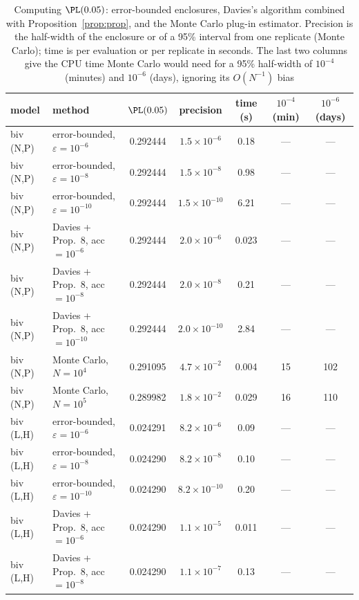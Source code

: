 \begin{table}[t]
\caption{Computing $\PL(0.05)$: error-bounded enclosures, Davies's algorithm combined with Proposition~\ref{prop:prop}, and the Monte Carlo plug-in estimator. Precision is the half-width of the enclosure or of a 95\% interval from one replicate (Monte Carlo); time is per evaluation or per replicate in seconds. The last two columns give the CPU time Monte Carlo would need for a 95\% half-width of $10^{-4}$ (minutes) and $10^{-6}$ (days), ignoring its $O(N^{-1})$ bias}\label{tab:benchpl}
\footnotesize\setlength{\tabcolsep}{2pt}
\begin{tabular*}{\textwidth}{@{\extracolsep\fill}llccccc@{}}
\toprule
model & method & $\PL(0.05)$ & precision & time (s) & $10^{-4}$ (min) & $10^{-6}$ (days)\\
\midrule
biv (N,P) & error-bounded, $\varepsilon=10^{-6}$ & 0.292444 & $1.5\times10^{-6}$ & 0.18 & --- & --- \\
biv (N,P) & error-bounded, $\varepsilon=10^{-8}$ & 0.292444 & $1.5\times10^{-8}$ & 0.98 & --- & --- \\
biv (N,P) & error-bounded, $\varepsilon=10^{-10}$ & 0.292444 & $1.5\times10^{-10}$ & 6.21 & --- & --- \\
biv (N,P) & Davies + Prop.~8, acc $=10^{-6}$ & 0.292444 & $2.0\times10^{-6}$ & 0.023 & --- & --- \\
biv (N,P) & Davies + Prop.~8, acc $=10^{-8}$ & 0.292444 & $2.0\times10^{-8}$ & 0.21 & --- & --- \\
biv (N,P) & Davies + Prop.~8, acc $=10^{-10}$ & 0.292444 & $2.0\times10^{-10}$ & 2.84 & --- & --- \\
biv (N,P) & Monte Carlo, $N=10^{4}$ & 0.291095 & $4.7\times10^{-2}$ & 0.004 & 15 & 102 \\
biv (N,P) & Monte Carlo, $N=10^{5}$ & 0.289982 & $1.8\times10^{-2}$ & 0.029 & 16 & 110 \\
\midrule
biv (L,H) & error-bounded, $\varepsilon=10^{-6}$ & 0.024291 & $8.2\times10^{-6}$ & 0.09 & --- & --- \\
biv (L,H) & error-bounded, $\varepsilon=10^{-8}$ & 0.024290 & $8.2\times10^{-8}$ & 0.10 & --- & --- \\
biv (L,H) & error-bounded, $\varepsilon=10^{-10}$ & 0.024290 & $8.2\times10^{-10}$ & 0.20 & --- & --- \\
biv (L,H) & Davies + Prop.~8, acc $=10^{-6}$ & 0.024290 & $1.1\times10^{-5}$ & 0.011 & --- & --- \\
biv (L,H) & Davies + Prop.~8, acc $=10^{-8}$ & 0.024290 & $1.1\times10^{-7}$ & 0.13 & --- & --- \\

\end{tabular*}
\end{table}
